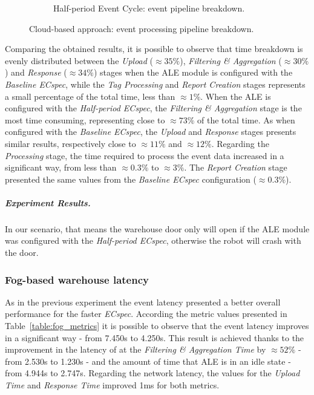 \begin{figure}[ht!]
\begin{subfigure}{.5\textwidth}
        \caption{Half-period Event Cycle: event pipeline breakdown.}
        \label{fig:ecspecf_effective_half}
      \end{subfigure}
      \caption[Cloud-based approach: event processing breakdown.]{Cloud-based approach: event processing pipeline breakdown.}
      \label{fig:ecspecf_effective_breakdown}
    \end{figure}

    Comparing the obtained results, it is possible to observe that time breakdown is evenly distributed
    between the \textit{Upload} ($\approx35\%$), \textit{Filtering \& Aggregation} ($\approx30\%$) and
    \textit{Response} ($\approx34\%$) stages when the \gls{ALE} module is configured with the \textit{Baseline ECspec},
    while the \textit{Tag Processing} and \textit{Report Creation} stages represents a small percentage of the
    total time, less than $\approx1\%$. When the \gls{ALE} is configured with the \textit{Half-period ECspec},
    the \textit{Filtering \& Aggregation} stage is the most time consuming, representing close to $\approx 73\%$
    of the total time. As when configured with the \textit{Baseline ECspec}, the \textit{Upload} and
    \textit{Response} stages presents similar results, respectively close to $\approx11\%$ and $\approx12\%$.
    Regarding the \textit{Processing} stage, the time required to process the event data increased in a significant
    way, from less than $\approx0.3\%$ to $\approx3\%$. The \textit{Report Creation} stage presented the same
    values from the \textit{Baseline ECspec} configuration ($\approx0.3\%$).

    \subparagraph{Experiment Results.}
    \label{subp:cloud_experiment_result}
    In our scenario, that means the warehouse door only will open if the \gls{ALE} module was configured
    with the \textit{Half-period ECspec}, otherwise the robot will crash with the door.

    \subsubsection{Fog-based warehouse latency}
    \label{subs:eval_exp_latency_ecspec}
    As in the previous experiment the event latency presented a better overall performance for the
    faster \textit{ECspec}. According the metric values presented in Table~\ref{table:fog_metrics} it is
    possible to observe that the event latency improves in a significant way - from 7.450s to 4.250s. This
    result is achieved thanks to the improvement in the latency of at the \textit{Filtering \& Aggregation Time}
    by $\approx52\%$ - from 2.530s to 1.230s - and the amount of time that \gls{ALE} is in an idle state -
    from 4.944s to 2.747s. Regarding the network latency, the values for the \textit{Upload Time}
    and \textit{Response Time} improved 1ms for both metrics.

